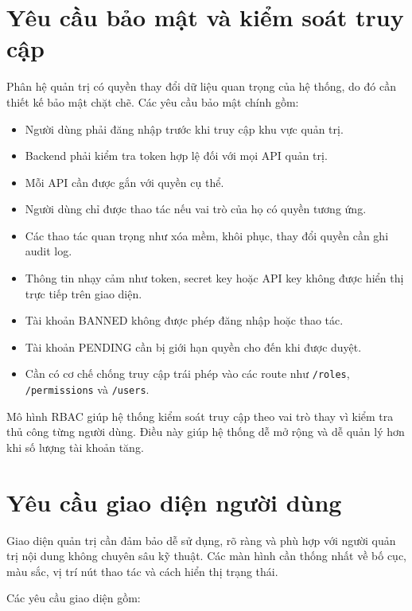 \documentclass[12pt,a4paper]{report}
\begin{document}
\section{Yêu cầu bảo mật và kiểm soát truy cập}

Phân hệ quản trị có quyền thay đổi dữ liệu quan trọng của hệ thống, do đó cần thiết kế bảo mật chặt chẽ. Các yêu cầu bảo mật chính gồm:

\begin{itemize}
    \item Người dùng phải đăng nhập trước khi truy cập khu vực quản trị.
    \item Backend phải kiểm tra token hợp lệ đối với mọi API quản trị.
    \item Mỗi API cần được gắn với quyền cụ thể.
    \item Người dùng chỉ được thao tác nếu vai trò của họ có quyền tương ứng.
    \item Các thao tác quan trọng như xóa mềm, khôi phục, thay đổi quyền cần ghi audit log.
    \item Thông tin nhạy cảm như token, secret key hoặc API key không được hiển thị trực tiếp trên giao diện.
    \item Tài khoản BANNED không được phép đăng nhập hoặc thao tác.
    \item Tài khoản PENDING cần bị giới hạn quyền cho đến khi được duyệt.
    \item Cần có cơ chế chống truy cập trái phép vào các route như \texttt{/roles}, \texttt{/permissions} và \texttt{/users}.
\end{itemize}

Mô hình RBAC giúp hệ thống kiểm soát truy cập theo vai trò thay vì kiểm tra thủ công từng người dùng. Điều này giúp hệ thống dễ mở rộng và dễ quản lý hơn khi số lượng tài khoản tăng.

\section{Yêu cầu giao diện người dùng}

Giao diện quản trị cần đảm bảo dễ sử dụng, rõ ràng và phù hợp với người quản trị nội dung không chuyên sâu kỹ thuật. Các màn hình cần thống nhất về bố cục, màu sắc, vị trí nút thao tác và cách hiển thị trạng thái.

Các yêu cầu giao diện gồm:
\end{document}
